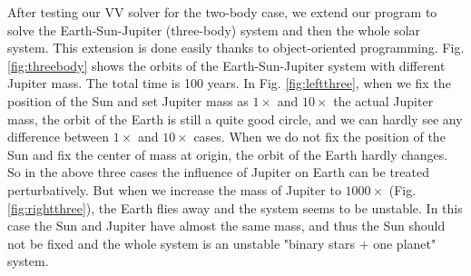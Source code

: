 After testing our VV solver for the two-body case, 
we extend our program to solve the Earth-Sun-Jupiter (three-body) system and then the whole solar system. 
This extension is done easily thanks to object-oriented programming. 
Fig. \ref{fig:threebody} shows the orbits of the Earth-Sun-Jupiter system with different Jupiter mass. 
The total time is 100 years. 
In Fig. \ref{fig:leftthree}, when we fix the position of the Sun and set Jupiter mass as $1\times$ and $10\times$ the actual Jupiter mass, 
the orbit of the Earth is still a quite good circle, and we can hardly see any difference between $1\times$ and $10\times$ cases. 
When we do not fix the position of the Sun and fix the center of mass at origin, 
the orbit of the Earth hardly changes. 
So in the above three cases the influence of Jupiter on Earth can be treated perturbatively. 
But when we increase the mass of Jupiter to $1000\times$ (Fig. \ref{fig:rightthree}), 
the Earth flies away and the system seems to be unstable. 
In this case the Sun and Jupiter have almost the same mass, 
and thus the Sun should not be fixed and the whole system is an unstable "binary stars + one planet" system. 
